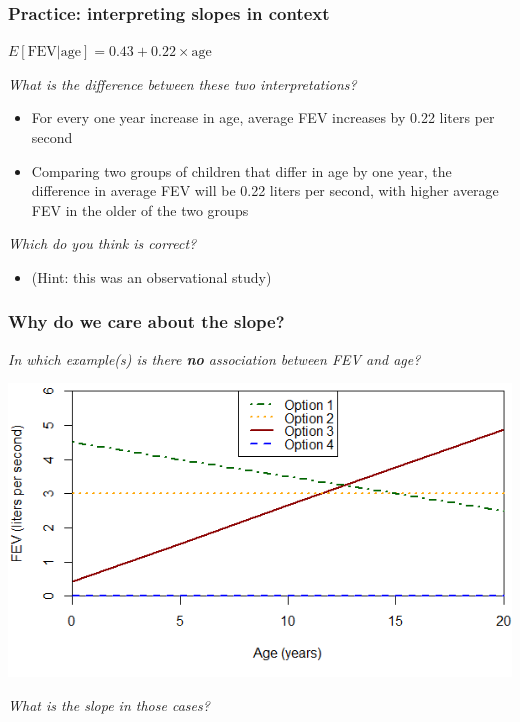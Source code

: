 \documentclass[12pt, 
hyperref={colorlinks=true, linkcolor=blue, urlcolor=cyan},dvipsnames]{beamer}
\begin{document}
\begin{frame}
\frametitle{Practice: interpreting slopes in context}

\begin{center} $E[\text{FEV} | \text{age}] = 0.43 + 0.22 \times \text{age}$ \end{center} 

\textit{What is the difference between these two interpretations?} \vspace{-0.3cm}
\begin{itemize}
\item For every one year increase in age, average FEV increases by 0.22 liters per second
\item Comparing two groups of children that differ in age by one year, the difference in average FEV will be 0.22 liters per second, with higher average FEV in the older of the two groups
\end{itemize} \pause

\textit{Which do you think is correct?} \vspace{-0.3cm} \pause 
\begin{itemize}
\item[] (Hint: this was an observational study)
\end{itemize}

\end{frame}

\begin{frame}
\frametitle{Why do we care about the slope?}

\begin{small} \textit{In which example(s) is there \textbf{no} association between FEV and age?} \vspace{-0.6cm} \end{small}

\hspace*{-0.6cm} \includegraphics[width=0.9\paperwidth]{./plots/association}

\pause
 \vspace{-0.7cm} \textit{What is the slope in those cases?}
\end{frame}
\end{document}
